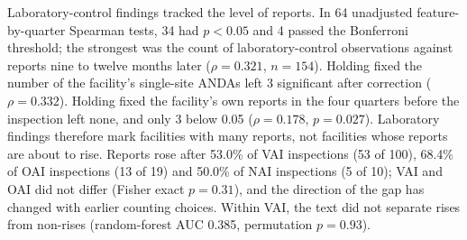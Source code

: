 \documentclass[12pt]{article}
\begin{document}
Laboratory-control findings tracked the level of reports. In 64 unadjusted
feature-by-quarter Spearman tests, 34 had $p<0.05$ and 4 passed the
Bonferroni threshold; the strongest was the count of laboratory-control
observations against reports nine to twelve months later ($\rho=0.321$,
$n=154$). Holding fixed the number of the facility's single-site ANDAs left
3 significant after correction ($\rho=0.332$). Holding fixed the facility's
own reports in the four quarters before the inspection left none, and only
3 below 0.05 ($\rho=0.178$, $p=0.027$). Laboratory findings therefore mark
facilities with many reports, not facilities whose reports are about to
rise. Reports rose after 53.0\% of VAI inspections (53 of 100), 68.4\% of
OAI inspections (13 of 19) and 50.0\% of NAI inspections (5 of 10); VAI and
OAI did not differ (Fisher exact $p=0.31$), and the direction of the gap has
changed with earlier counting choices. Within VAI, the text did not separate
rises from non-rises (random-forest AUC 0.385, permutation $p=0.93$).
\end{document}
